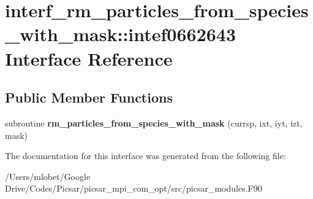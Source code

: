 \hypertarget{interfaceinterf__rm__particles__from__species__with__mask_1_1intef0662643}{}\section{interf\+\_\+rm\+\_\+particles\+\_\+from\+\_\+species\+\_\+with\+\_\+mask\+:\+:intef0662643 Interface Reference}
\label{interfaceinterf__rm__particles__from__species__with__mask_1_1intef0662643}
\subsection*{Public Member Functions}
\begin{DoxyCompactItemize}
\item 
subroutine {\bfseries rm\+\_\+particles\+\_\+from\+\_\+species\+\_\+with\+\_\+mask} (currsp, ixt, iyt, izt, mask)\hypertarget{interfaceinterf__rm__particles__from__species__with__mask_1_1intef0662643_ac634520d748d27999ccea3030839c503}{}\label{interfaceinterf__rm__particles__from__species__with__mask_1_1intef0662643_ac634520d748d27999ccea3030839c503}

\end{DoxyCompactItemize}


The documentation for this interface was generated from the following file\+:\begin{DoxyCompactItemize}
\item 
/\+Users/mlobet/\+Google Drive/\+Codes/\+Picsar/picsar\+\_\+mpi\+\_\+com\+\_\+opt/src/picsar\+\_\+modules.\+F90\end{DoxyCompactItemize}
